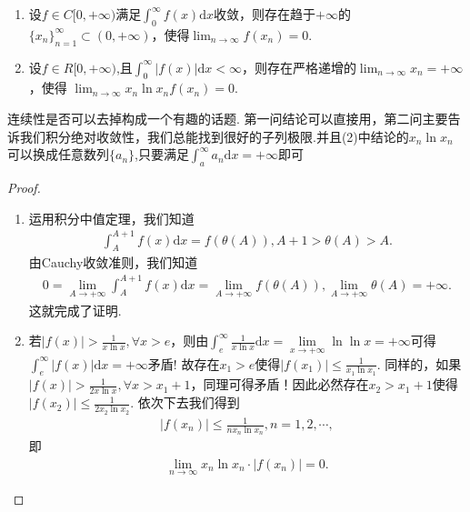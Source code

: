 \documentclass[../../main.tex]{subfiles}%
\begin{document}
\begin{proposition}[积分收敛必有子列趋于0]\label{proposition:积分收敛必有子列趋于0}
\begin{enumerate}[(1)]
\item 设$f\in C[0,+\infty)$满足$\int_{0}^{\infty}f(x)\mathrm{d}x$收敛，则存在趋于$+\infty$的$\{x_n\}_{n = 1}^{\infty}\subset(0,+\infty)$，使得$\lim_{n\to\infty}f(x_n)=0$.

\item 设$f\in R[0,+\infty)$,且$\int_{0}^{\infty}|f(x)|\mathrm{d}x < \infty$，则存在严格递增的$\lim_{n\to\infty}x_n = +\infty$，使得
$\lim_{n\to\infty}x_n\ln x_nf(x_n)=0$.
\end{enumerate}
\end{proposition}
\begin{note}
连续性是否可以去掉构成一个有趣的话题. 第一问结论可以直接用，第二问主要告诉我们积分绝对收敛性，我们总能找到很好的子列极限.并且(2)中结论的$x_n \ln x_n$可以换成任意数列$\{a_n\}$,只要满足$\int_{a}^{\infty}a_n\mathrm{d}x=+\infty$即可
\end{note}
\begin{proof}
\begin{enumerate}[(1)]
\item 运用积分中值定理，我们知道
\begin{align*}
\int_{A}^{A + 1}f(x)\mathrm{d}x = f(\theta(A)), A + 1 > \theta(A) > A.
\end{align*}
由Cauchy收敛准则，我们知道
\begin{align*}
0 = \lim_{A\to +\infty}\int_{A}^{A + 1}f(x)\mathrm{d}x = \lim_{A\to +\infty}f(\theta(A)), \lim_{A\to +\infty}\theta(A) = +\infty.
\end{align*}
这就完成了证明.

\item 若$|f(x)| > \frac{1}{x\ln x}, \forall x > e$，则由$\int_e^{\infty}{\frac{1}{x\ln x}\mathrm{d}x}=\underset{x\rightarrow +\infty}{\lim}\ln\ln x=+\infty $可得$\int_e^{\infty}{\left| f\left( x \right) \right|\mathrm{d}x}=+\infty $矛盾! 故存在$x_1 > e$使得$|f(x_1)| \leqslant \frac{1}{x_1\ln x_1}$.
同样的，如果$|f(x)| > \frac{1}{2x\ln x}, \forall x > x_1 + 1$，同理可得矛盾！因此必然存在$x_2 > x_1 + 1$使得$|f(x_2)| \leqslant \frac{1}{2x_2\ln x_2}$. 依次下去我们得到
\begin{align*}
|f(x_n)| \leqslant \frac{1}{nx_n\ln x_n}, n = 1,2,\cdots,
\end{align*}
即
\begin{align*}
\lim_{n\to\infty}x_n\ln x_n\cdot|f(x_n)| = 0.
\end{align*} 
\end{enumerate}

\end{proof}
\end{document}
